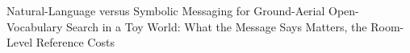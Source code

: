 Natural-Language versus Symbolic Messaging for Ground-Aerial Open-Vocabulary Search in a Toy World: What the Message Says Matters, the Room-Level Reference Costs

